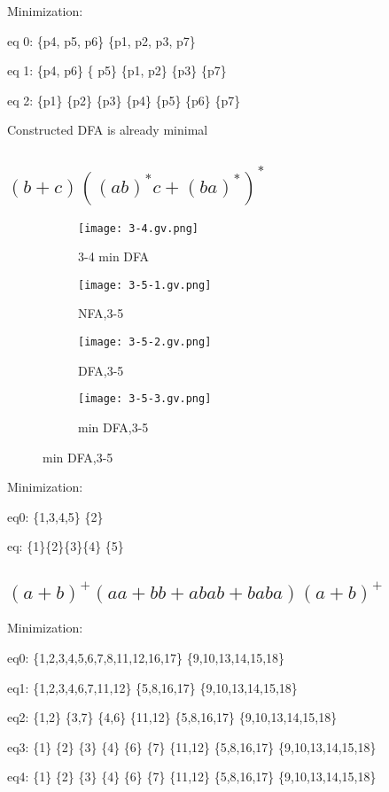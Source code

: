 \documentclass{article}
\begin{document}
Minimization:

eq 0: \{p4, p5, p6\} \{p1, p2, p3, p7\}

eq 1: \{p4, p6\} \{ p5\} \{p1, p2\}  \{p3\} \{p7\}

eq 2: \{p1\} \{p2\} \{p3\} \{p4\} \{p5\} \{p6\} \{p7\} 

Constructed DFA is already minimal


\subsection{$(b+c)((ab)^{*}c+(ba)^{*})^{*}$}

\begin{figure}[h]
\begin{subfigure}
\centering
\texttt{[image: 3-4.gv.png]}
\caption{3-4 min DFA}
\end{subfigure}
\begin{subfigure}
\centering
\texttt{[image: 3-5-1.gv.png]}
\caption{NFA,3-5}
\end{subfigure}
\begin{subfigure}
\centering
\texttt{[image: 3-5-2.gv.png]}
\caption{DFA,3-5}
\end{subfigure}
\begin{subfigure}
\centering
\texttt{[image: 3-5-3.gv.png]}
\caption{min DFA,3-5}
\end{subfigure}
\end{figure}

Minimization:

eq0: \{1,3,4,5\} \{2\}

eq: \{1\}\{2\}\{3\}\{4\} \{5\}

\subsection{$(a+b)^{+}(a a+bb+abab+baba)(a+b)^{+}$}


Minimization:

eq0: \{1,2,3,4,5,6,7,8,11,12,16,17\} \{9,10,13,14,15,18\}

eq1: \{1,2,3,4,6,7,11,12\} \{5,8,16,17\} \{9,10,13,14,15,18\}

eq2: \{1,2\} \{3,7\} \{4,6\} \{11,12\} \{5,8,16,17\} \{9,10,13,14,15,18\}

eq3: \{1\} \{2\} \{3\} \{4\} \{6\} \{7\} \{11,12\} \{5,8,16,17\} \{9,10,13,14,15,18\}

eq4: \{1\} \{2\} \{3\} \{4\} \{6\} \{7\} \{11,12\} \{5,8,16,17\} \{9,10,13,14,15,18\}
\end{document}
